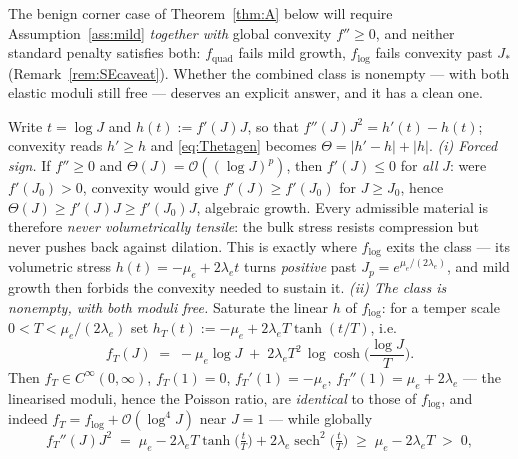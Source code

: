 The benign corner case of Theorem~\ref{thm:A} below will require Assumption~\ref{ass:mild} \emph{together with} global
convexity $f''\ge0$, and neither standard penalty satisfies both: $f_{\mathrm{quad}}$ fails mild growth, $f_{\log}$
fails convexity past $J_*$ (Remark~\ref{rem:SEcaveat}). Whether the combined class is nonempty --- with both elastic
moduli still free --- deserves an explicit answer, and it has a clean one.

\begin{remark}
    \label{rem:tempered}
    Write $t=\log J$ and $h(t):=f'(J)J$, so that $f''(J)J^2=h'(t)-h(t)$; convexity reads $h'\ge h$ and
    \eqref{eq:Thetagen} becomes $\Theta=|h'-h|+|h|$.
    \emph{(i) Forced sign.} If $f''\ge0$ and $\Theta(J)=\mathcal{O}((\log J)^p)$, then $f'(J)\le 0$ for \emph{all}
    $J$: were $f'(J_0)>0$, convexity would give $f'(J)\ge f'(J_0)$ for $J\ge J_0$, hence
    $\Theta(J)\ge f'(J)J\ge f'(J_0)J$, algebraic growth. Every admissible material is therefore
    \emph{never volumetrically tensile}: the bulk stress resists compression but never pushes back against dilation.
    This is exactly where $f_{\log}$ exits the class --- its volumetric stress $h(t)=-\mu_e+2\lambda_e t$ turns
    \emph{positive} past $J_p=e^{\mu_e/(2\lambda_e)}$, and mild growth then forbids the convexity needed to sustain it.
    \emph{(ii) The class is nonempty, with both moduli free.} Saturate the linear $h$ of $f_{\log}$: for a temper scale
    $0<T<\mu_e/(2\lambda_e)$ set $h_T(t):=-\mu_e+2\lambda_e T\tanh(t/T)$, i.e.
    \begin{equation}
        \label{eq:ftempered}
        f_T(J) \;=\; -\mu_e\log J \;+\; 2\lambda_e T^2\,\log\cosh\!\Big(\frac{\log J}{T}\Big) .
    \end{equation}
    Then $f_T\in C^\infty(0,\infty)$, $f_T(1)=0$, $f_T'(1)=-\mu_e$, $f_T''(1)=\mu_e+2\lambda_e$ --- the linearised
    moduli, hence the Poisson ratio, are \emph{identical} to those of $f_{\log}$, and indeed
    $f_T=f_{\log}+\mathcal{O}(\log^4 J)$ near $J=1$ --- while globally
    \begin{equation*}
        f_T''(J)J^2 \;=\; \mu_e-2\lambda_e T\tanh\big(\tfrac{t}{T}\big)+2\lambda_e\operatorname{sech}^2\big(\tfrac{t}{T}\big)
        \;\ge\; \mu_e-2\lambda_e T \;>\;0,

\end{equation*}
\end{remark}
